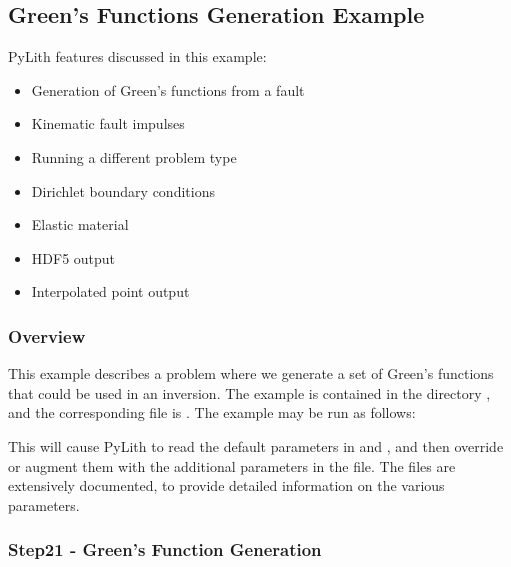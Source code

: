 \subsection{Green's Functions Generation Example}
\label{sec:example:3dhex8:greensfns}

PyLith features discussed in this example:
\begin{itemize}
\item Generation of Green's functions from a fault
\item Kinematic fault impulses
\item Running a different problem type
\item Dirichlet boundary conditions
\item Elastic material
\item HDF5 output
\item Interpolated point output
\end{itemize}

\subsubsection{Overview}

This example describes a problem where we generate a set of Green's
functions that could be used in an inversion. The example is contained
in the directory , and the corresponding
 file is . The example may be run
as follows:
This will cause PyLith to read the default parameters in
 and , and then
override or augment them with the additional parameters in the
 file. The  files are extensively
documented, to provide detailed information on the various parameters.


\subsubsection{Step21 - Green's Function Generation}

